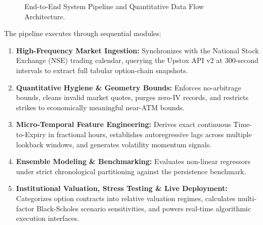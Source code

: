 \begin{figure}[htbp]
{%
    }
    \caption{End-to-End System Pipeline and Quantitative Data Flow Architecture.}
    \label{fig:pipeline_architecture}
    \label{fig:system_architecture_tikz}
\end{figure}

The pipeline executes through sequential modules:
\begin{enumerate}
    \item \textbf{High-Frequency Market Ingestion:} Synchronizes with the National Stock Exchange (NSE) trading calendar, querying the Upstox API v2 at 300-second intervals to extract full tabular option-chain snapshots.
    \item \textbf{Quantitative Hygiene \& Geometry Bounds:} Enforces no-arbitrage bounds, cleans invalid market quotes, purges zero-IV records, and restricts strikes to economically meaningful near-ATM bounds.
    \item \textbf{Micro-Temporal Feature Engineering:} Derives exact continuous Time-to-Expiry in fractional hours, establishes autoregressive lags across multiple lookback windows, and generates volatility momentum signals.
    \item \textbf{Ensemble Modeling \& Benchmarking:} Evaluates non-linear regressors under strict chronological partitioning against the persistence benchmark.
    \item \textbf{Institutional Valuation, Stress Testing \& Live Deployment:} Categorizes option contracts into relative valuation regimes, calculates multi-factor Black-Scholes scenario sensitivities, and powers real-time algorithmic execution interfaces.
\end{enumerate}

